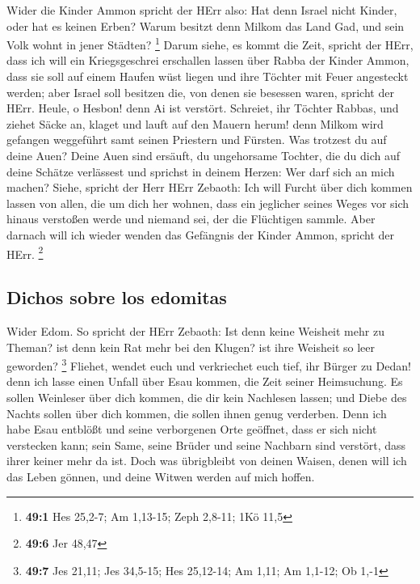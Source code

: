  Wider die Kinder Ammon spricht der HErr also: Hat denn
Israel nicht Kinder, oder hat es keinen Erben? Warum besitzt denn Milkom
das Land Gad, und sein Volk wohnt in jener Städten? \footnote{\textbf{49:1}
  Hes 25,2-7; Am 1,13-15; Zeph 2,8-11; 1Kö 11,5}  Darum
siehe, es kommt die Zeit, spricht der HErr, dass ich will ein
Kriegsgeschrei erschallen lassen über Rabba der Kinder Ammon, dass sie
soll auf einem Haufen wüst liegen und ihre Töchter mit Feuer angesteckt
werden; aber Israel soll besitzen die, von denen sie besessen waren,
spricht der HErr.  Heule, o Hesbon! denn Ai ist verstört.
Schreiet, ihr Töchter Rabbas, und ziehet Säcke an, klaget und lauft auf
den Mauern herum! denn Milkom wird gefangen weggeführt samt seinen
Priestern und Fürsten.  Was trotzest du auf deine Auen?
Deine Auen sind ersäuft, du ungehorsame Tochter, die du dich auf deine
Schätze verlässest und sprichst in deinem Herzen: Wer darf sich an mich
machen?  Siehe, spricht der Herr HErr Zebaoth: Ich will
Furcht über dich kommen lassen von allen, die um dich her wohnen, dass
ein jeglicher seines Weges vor sich hinaus verstoßen werde und niemand
sei, der die Flüchtigen sammle.  Aber darnach will ich
wieder wenden das Gefängnis der Kinder Ammon, spricht der HErr.
\footnote{\textbf{49:6} Jer 48,47}

\hypertarget{dichos-sobre-los-edomitas}{%
\subsection{Dichos sobre los edomitas}\label{dichos-sobre-los-edomitas}}

 Wider Edom. So spricht der HErr Zebaoth: Ist denn keine
Weisheit mehr zu Theman? ist denn kein Rat mehr bei den Klugen? ist ihre
Weisheit so leer geworden? \footnote{\textbf{49:7} Jes 21,11; Jes
  34,5-15; Hes 25,12-14; Am 1,11; Am 1,1-12; Ob 1,-1} 
Fliehet, wendet euch und verkriechet euch tief, ihr Bürger zu Dedan!
denn ich lasse einen Unfall über Esau kommen, die Zeit seiner
Heimsuchung.  Es sollen Weinleser über dich kommen, die
dir kein Nachlesen lassen; und Diebe des Nachts sollen über dich kommen,
die sollen ihnen genug verderben.  Denn ich habe Esau
entblößt und seine verborgenen Orte geöffnet, dass er sich nicht
verstecken kann; sein Same, seine Brüder und seine Nachbarn sind
verstört, dass ihrer keiner mehr da ist.  Doch was
übrigbleibt von deinen Waisen, denen will ich das Leben gönnen, und
deine Witwen werden auf mich hoffen.

